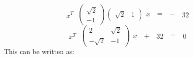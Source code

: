 \documentclass{beamer}
\begin{document}
\[
\begin{matrix}
\textbf{$x^T$}
\end{matrix} 
\
%
\left( \begin{array}{cc}
\sqrt{2} \\
 -1
\end{array} \right)
%
\left( \begin{array}{cc}
\sqrt{2} &1
\end{array} \right)
%
\begin{matrix}
\textbf{$x$}
\end{matrix} 
\
%
\begin{matrix}
=
\end{matrix} 
\
%
\begin{matrix}
-
\end{matrix} 
\
%
\begin{matrix}
\textbf{$32$}
\end{matrix} 
\
\]
\[
\begin{matrix}
\textbf{$x^T$}
\end{matrix} 
\
%
\left( \begin{array}{cc}
2 &\sqrt{2} \\
-\sqrt{2}& -1
\end{array} \right)
%
\begin{matrix}
\textbf{$x$}
\end{matrix} 
\
%
\begin{matrix}
+
\end{matrix} 
\
%
\begin{matrix}
\textbf{$32$}
\end{matrix} 
\
%
\begin{matrix}
=
\end{matrix} 
\
%
\begin{matrix}
0
\end{matrix} 
\
\]
This can be written as:
\end{document}
